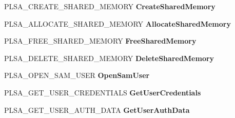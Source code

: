 \begin{DoxyCompactItemize}
P\+L\+S\+A\+\_\+\+C\+R\+E\+A\+T\+E\+\_\+\+S\+H\+A\+R\+E\+D\+\_\+\+M\+E\+M\+O\+RY {\bfseries Create\+Shared\+Memory}
\item 
\mbox{\label{struct___l_s_a___s_e_c_p_k_g___f_u_n_c_t_i_o_n___t_a_b_l_e_aff9bb6104509cffc618853d4bbcb2f87}} 
P\+L\+S\+A\+\_\+\+A\+L\+L\+O\+C\+A\+T\+E\+\_\+\+S\+H\+A\+R\+E\+D\+\_\+\+M\+E\+M\+O\+RY {\bfseries Allocate\+Shared\+Memory}
\item 
\mbox{\label{struct___l_s_a___s_e_c_p_k_g___f_u_n_c_t_i_o_n___t_a_b_l_e_a6102a71b53e22e554c7fa3321e6f7717}} 
P\+L\+S\+A\+\_\+\+F\+R\+E\+E\+\_\+\+S\+H\+A\+R\+E\+D\+\_\+\+M\+E\+M\+O\+RY {\bfseries Free\+Shared\+Memory}
\item 
\mbox{\label{struct___l_s_a___s_e_c_p_k_g___f_u_n_c_t_i_o_n___t_a_b_l_e_a1ee989a1628660d883051df6b001c4f2}} 
P\+L\+S\+A\+\_\+\+D\+E\+L\+E\+T\+E\+\_\+\+S\+H\+A\+R\+E\+D\+\_\+\+M\+E\+M\+O\+RY {\bfseries Delete\+Shared\+Memory}
\item 
\mbox{\label{struct___l_s_a___s_e_c_p_k_g___f_u_n_c_t_i_o_n___t_a_b_l_e_a4476f8648c88d0950e40c48eb139ad48}} 
P\+L\+S\+A\+\_\+\+O\+P\+E\+N\+\_\+\+S\+A\+M\+\_\+\+U\+S\+ER {\bfseries Open\+Sam\+User}
\item 
\mbox{\label{struct___l_s_a___s_e_c_p_k_g___f_u_n_c_t_i_o_n___t_a_b_l_e_aa3f98aede6627cfc1c4da2289be22188}} 
P\+L\+S\+A\+\_\+\+G\+E\+T\+\_\+\+U\+S\+E\+R\+\_\+\+C\+R\+E\+D\+E\+N\+T\+I\+A\+LS {\bfseries Get\+User\+Credentials}
\item 
\mbox{\label{struct___l_s_a___s_e_c_p_k_g___f_u_n_c_t_i_o_n___t_a_b_l_e_a56e5070d01e23e72eadad010c5c72a55}} 
P\+L\+S\+A\+\_\+\+G\+E\+T\+\_\+\+U\+S\+E\+R\+\_\+\+A\+U\+T\+H\+\_\+\+D\+A\+TA {\bfseries Get\+User\+Auth\+Data}
\item 
\mbox{\label{struct___l_s_a___s_e_c_p_k_g___f_u_n_c_t_i_o_n___t_a_b_l_e_abba7b46f570af6c6044135baa3513b82}} 

\end{DoxyCompactItemize}

